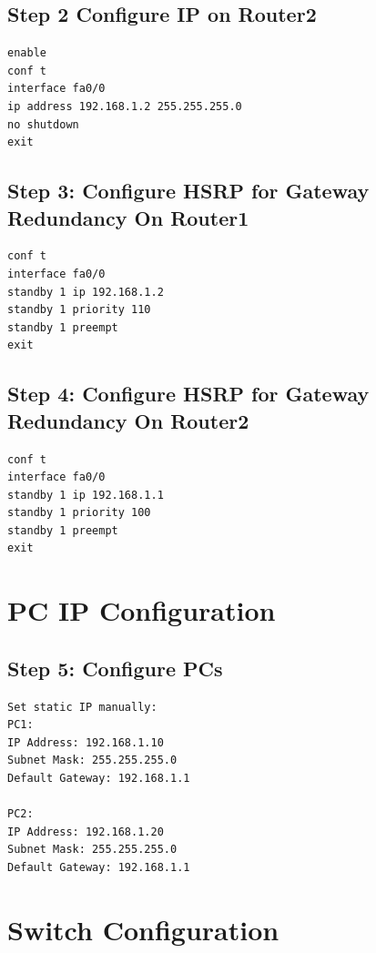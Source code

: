 \documentclass[12pt]{report}
\begin{document}
\subsection*{Step 2 Configure IP on Router2}
\begin{Verbatim}[fontsize=\small, formatcom=\hackfont\color{black}, frame=single]
enable
conf t
interface fa0/0
ip address 192.168.1.2 255.255.255.0
no shutdown
exit
\end{Verbatim}

\subsection*{Step 3: Configure HSRP for Gateway Redundancy On Router1}
\begin{Verbatim}[fontsize=\small, formatcom=\hackfont\color{black}, frame=single]
conf t
interface fa0/0
standby 1 ip 192.168.1.2
standby 1 priority 110
standby 1 preempt
exit
\end{Verbatim}

\subsection*{Step 4: Configure HSRP for Gateway Redundancy On Router2}
\begin{Verbatim}[fontsize=\small, formatcom=\hackfont\color{black}, frame=single]
conf t
interface fa0/0
standby 1 ip 192.168.1.1
standby 1 priority 100
standby 1 preempt
exit
\end{Verbatim}

\section{PC IP Configuration}
\subsection*{Step 5: Configure PCs}
\begin{Verbatim}[fontsize=\small, formatcom=\hackfont\color{black}]
Set static IP manually:
PC1: 
IP Address: 192.168.1.10 
Subnet Mask: 255.255.255.0
Default Gateway: 192.168.1.1

PC2:
IP Address: 192.168.1.20
Subnet Mask: 255.255.255.0
Default Gateway: 192.168.1.1
\end{Verbatim}

\section{Switch Configuration}
\end{document}
